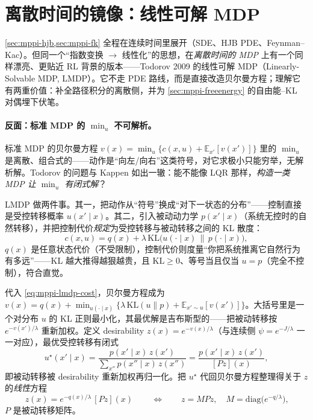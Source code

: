 \section{离散时间的镜像：线性可解 MDP}
\label{sec:mppi-lmdp}

\cref{sec:mppi-hjb,sec:mppi-fk} 全程在连续时间里展开（SDE、HJB PDE、Feynman--Kac）。但同一个“指数变换 $\to$ 线性化”的思想，在\emph{离散时间的 MDP} 上有一个同样漂亮、更贴近 RL 背景的版本——Todorov 2009 的线性可解 MDP（Linearly-Solvable MDP, LMDP）\cite{todorov2009efficient}。它不走 PDE 路线，而是直接改造贝尔曼方程；理解它有两重价值：补全路径积分的离散侧，并为 \cref{sec:mppi-freeenergy} 的自由能--KL 对偶埋下伏笔。

\paragraph{反面：标准 MDP 的 $\min_u$ 不可解析。}标准 MDP 的贝尔曼方程 $v(x)=\min_u\{c(x,u)+\mathbb{E}_{x'}[v(x')]\}$ 里的 $\min_u$ 是离散、组合式的——动作是“向左/向右”这类符号，对它求极小只能穷举，无解析解。Todorov 的问题与 Kappen 如出一辙：能不能像 LQR 那样，\emph{构造一类 MDP 让 $\min_u$ 有闭式解}？

\begin{definition}\label{def:mppi-lmdp}
LMDP 做两件事。其一，把动作从“符号”换成“对下一状态的分布”——控制直接是受控转移概率 $u(x'\mid x)$。其二，引入被动动力学 $p(x'\mid x)$（系统无控时的自然转移），并把控制代价\emph{规定}为受控转移与被动转移之间的 KL 散度：
\begin{equation}
  c(x,u)=q(x)+\lambda\,\mathrm{KL}\big(u(\cdot\mid x)\,\big\|\,p(\cdot\mid x)\big),
  \label{eq:mppi-lmdp-cost}
\end{equation}
$q(x)$ 是任意状态代价（不受限制），控制代价则度量“你把系统推离它自然行为有多远”——KL 越大推得越狠越贵，且 $\mathrm{KL}\ge0$、等号当且仅当 $u=p$（完全不控制），符合直觉。
\end{definition}

\begin{theorem}[线性贝尔曼方程 $z=MPz$]\label{thm:mppi-lmdp}
代入 \cref{eq:mppi-lmdp-cost}，贝尔曼方程成为 $v(x)=q(x)+\min_{u(\cdot\mid x)}\{\lambda\,\mathrm{KL}(u\|p)+\mathbb{E}_{x'\sim u}[v(x')]\}$。大括号里是一个对分布 $u$ 的 KL 正则最小化，其最优解是吉布斯型的——把被动转移按 $e^{-v(x')/\lambda}$ 重新加权。定义 desirability $z(x)=e^{-v(x)/\lambda}$（与连续侧 $\psi=e^{-J/\lambda}$ 一一对应），最优受控转移有闭式
\begin{equation}
  u^\star(x'\mid x)=\frac{p(x'\mid x)\,z(x')}{\sum_{x''}p(x''\mid x)\,z(x'')}=\frac{p(x'\mid x)\,z(x')}{[Pz](x)},
  \label{eq:mppi-lmdp-ustar}
\end{equation}
即被动转移被 desirability 重新加权再归一化。把 $u^\star$ 代回贝尔曼方程整理得关于 $z$ 的\emph{线性}方程
\begin{equation}
  \boxed{\,z(x)=e^{-q(x)/\lambda}\,[Pz](x)\,}\qquad\Longleftrightarrow\qquad z=MPz,\quad M=\mathrm{diag}\big(e^{-q/\lambda}\big),
  \label{eq:mppi-zmpz}
\end{equation}
$P$ 是被动转移矩阵。
\end{theorem}

